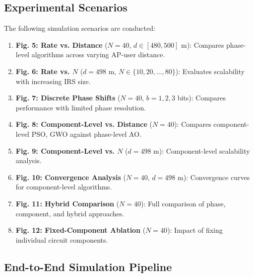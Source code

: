 \documentclass[12pt,a4paper]{article}
\begin{document}
\subsection{Experimental Scenarios}

The following simulation scenarios are conducted:

\begin{enumerate}
    \item \textbf{Fig. 5: Rate vs. Distance} ($N = 40$, $d \in [480, 500]$ m): Compares phase-level algorithms across varying AP-user distance.

    \item \textbf{Fig. 6: Rate vs. $N$} ($d = 498$ m, $N \in \{10, 20, \ldots, 80\}$): Evaluates scalability with increasing IRS size.

    \item \textbf{Fig. 7: Discrete Phase Shifts} ($N = 40$, $b = 1, 2, 3$ bits): Compares performance with limited phase resolution.

    \item \textbf{Fig. 8: Component-Level vs. Distance} ($N = 40$): Compares component-level PSO, GWO against phase-level AO.

    \item \textbf{Fig. 9: Component-Level vs. $N$} ($d = 498$ m): Component-level scalability analysis.

    \item \textbf{Fig. 10: Convergence Analysis} ($N = 40$, $d = 498$ m): Convergence curves for component-level algorithms.

    \item \textbf{Fig. 11: Hybrid Comparison} ($N = 40$): Full comparison of phase, component, and hybrid approaches.

    \item \textbf{Fig. 12: Fixed-Component Ablation} ($N = 40$): Impact of fixing individual circuit components.
\end{enumerate}

\subsection{End-to-End Simulation Pipeline}
\end{document}
